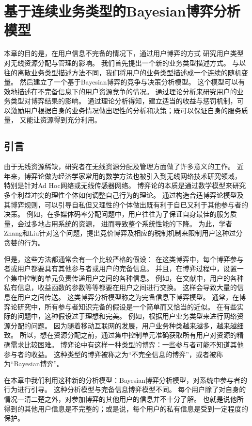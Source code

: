 \graphicspath{ {../body/bayesian_figures/}}
\chapter{基于连续业务类型的Bayesian博弈分析模型}
\par 
本章的目的是，在用户信息不完备的情况下，通过用户博弈的方式
研究用户类型对无线资源分配与管理的影响。
我们首先提出一个新的业务类型描述方式。
与以往的离散业务类型描述方法不同，我们将用户的业务类型描述成一个连续的随机变量。
然后建立了一个基于Bayesian博弈的竞争与决策分析模型。
这个模型可以有效地描述在不完备信息下的用户资源竞争的情况。
通过理论分析来研究用户的业务类型对博弈结果的影响。
通过理论分析得知，建立适当的收益与惩罚机制，可以激励用户根据自身的业务情况做出理性的分析和决策；既可以保证自身的服务质量，
又能让资源得到充分利用。
%
\section{引言}
由于无线资源稀缺，研究者在无线资源分配及管理方面做了许多意义的工作。
近年来，博弈论做为经济学家常用的数学方法也被引入到无线网络技术研究领域，
特别是针对Ad Hoc网络或无线传感器网络\cite{Srivastava:2005}\cite{FangBensaou2004}。
博弈论的本质是通过数学模型来研究多个利益冲突的理性个体如何调整自己行为的理论。
通过构造合适博弈论模型及其博弈规则，可以引导自私但又理性的个体做出既有利于自已又利于其他参与者的决策。
例如，在多媒体码率分配问题中，用户往往为了保证自身最佳的服务质量，会过多地占用系统的资源，
进而导致整个系统性能的下降。
为此，学者Zhang和Liu针对这个问题，提出竞价博弈及相应的税制机制来限制用户这种过分贪婪的行为\cite{ZhangLiu2011}。

但是，这些方法都通常会有一个比较严格的假设：
在这类博弈中，每个博弈参与者或用户都要具有其他参与者或用户的完备信息。
并且，在博弈过程中，设置一个集中控制的单元负责传递用户之间的各种信息。
例如，在文献\cite{ZhangLiu2011}中，用户的各种私有信息，收益函数的参数等等都要在用户之间进行交换。
这样会导致大量的信息在用户之间传送。
这类博弈分析模型称之为完备信息下博弈模型。
通常，在博弈论研究中，所有参与者知识完备的假设是一个简单而又恰当的近似。
在有些实际的问题中，这种假设过于理想和完美。
例如，根据用户业务类型来进行网络资源分配的问题。
因为随着移动互联网的发展，用户业务种类越来越多，越来越细致。
所以，想在资源分配之前，通过集中控制单元准确获取所有用户对资源的精确需求比较困难。
博弈论中有这样一种类型的博弈：一些参与者可能不知道其他参与者的收益。
这种类型的博弈被称之为“不完全信息的博弈”，或者被称为“Bayesian博弈”。

在本章中我们利用这种新的分析模型：Bayesian博弈分析模型，对系统中参与者的行为进行引导。
这种分析模型与完备信息博弈模型不同。
每个用户除了对自身的情况一清二楚之外，对参加博弈的其他用户的信息并不十分了解。
也就是说他所得到的其他用户信息是不完整的；或是说，每个用户的私有信息是受到一定程度的保护。

